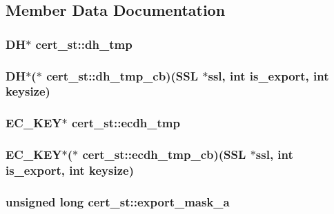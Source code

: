 \subsection{Member Data Documentation}
\hypertarget{structcert__st_abb30e89df1ada4afc3cf585cee30b3fd}{
\subsubsection[{dh\-\_\-tmp}]{\setlength{\rightskip}{0pt plus 5cm}D\-H$\ast$ cert\-\_\-st\-::dh\-\_\-tmp}}\label{structcert__st_abb30e89df1ada4afc3cf585cee30b3fd}
\hypertarget{structcert__st_aec67db7c449f9dbcba4a454ecc45739c}{
\subsubsection[{dh\-\_\-tmp\-\_\-cb}]{\setlength{\rightskip}{0pt plus 5cm}D\-H$\ast$($\ast$ cert\-\_\-st\-::dh\-\_\-tmp\-\_\-cb)(S\-S\-L $\ast$ssl, int is\-\_\-export, int keysize)}}\label{structcert__st_aec67db7c449f9dbcba4a454ecc45739c}
\hypertarget{structcert__st_a7fb20c811cf6eaa03dce02639d65846b}{
\subsubsection[{ecdh\-\_\-tmp}]{\setlength{\rightskip}{0pt plus 5cm}E\-C\-\_\-\-K\-E\-Y$\ast$ cert\-\_\-st\-::ecdh\-\_\-tmp}}\label{structcert__st_a7fb20c811cf6eaa03dce02639d65846b}
\hypertarget{structcert__st_a42879a7795442d726faf0237b9d3b5e4}{
\subsubsection[{ecdh\-\_\-tmp\-\_\-cb}]{\setlength{\rightskip}{0pt plus 5cm}E\-C\-\_\-\-K\-E\-Y$\ast$($\ast$ cert\-\_\-st\-::ecdh\-\_\-tmp\-\_\-cb)(S\-S\-L $\ast$ssl, int is\-\_\-export, int keysize)}}\label{structcert__st_a42879a7795442d726faf0237b9d3b5e4}
\hypertarget{structcert__st_a75029765406f9a442d9767764a2387fb}{
\subsubsection[{export\-\_\-mask\-\_\-a}]{\setlength{\rightskip}{0pt plus 5cm}unsigned long cert\-\_\-st\-::export\-\_\-mask\-\_\-a}}\label{structcert__st_a75029765406f9a442d9767764a2387fb}
